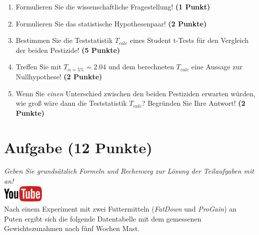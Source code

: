 \documentclass[a4paper, 9pt]{scrartcl}\usepackage[]{graphicx}\usepackage[]{xcolor}
\begin{document}
\begin{enumerate}
  \item Formulieren Sie die wissenschaftliche Fragestellung! \textbf{(1 Punkt)}
  \item Formulieren Sie das statistische Hypothesenpaar! \textbf{(2
      Punkte)}
  \item Bestimmen Sie die Teststatistik $T_{calc}$ eines Student t-Tests f{\"u}r den
  Vergleich der beiden Pestizide! \textbf{(5 Punkte)}
\item Treffen Sie mit $T_{\alpha = 5\%} = 2.04$ und dem berechneten $T_{calc}$ eine Aussage
  zur Nullhypothese! \textbf{(2 Punkte)}
\item Wenn Sie \textit{einen} Unterschied zwischen den beiden
  Pestiziden erwarten w{\"u}rden, wie gro{\ss} w{\"a}re dann die Teststatistik
  $T_{calc}$? Begr{\"u}nden Sie Ihre Antwort! \textbf{(2 Punkte)}
\end{enumerate} 
\clearpage

\section{Aufgabe \hfill (12 Punkte)}

\textit{Geben Sie grunds{\"a}tzlich Formeln und Rechenweg zur L{\"o}sung der
  Teilaufgaben mit an!} \\[1Ex]

\hfill\href{https://youtu.be/TbSEOMCQYl4}{\includegraphics[width =
  2cm]{img/youtube}}\\[1Ex]

Nach einem Experiment mit zwei Futtermitteln (\textit{FatDown} und
\textit{ProGain}) an Puten ergibt sich die folgende Datentabelle mit dem gemessenen
Gewichtszunahmen nach f{\"u}nf Wochen Mast.
\end{document}
